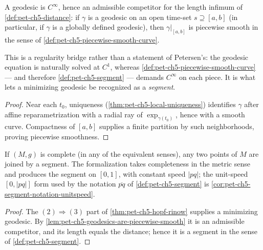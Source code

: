 \begin{lemma}
  \label{lem:pet-ch5-geodesics-are-piecewise-smooth}


  A geodesic is $C^\infty$, hence an admissible competitor for the length
  infimum of \cref{def:pet-ch5-distance}: if $\gamma$ is a geodesic on an open
  time-set $s\supseteq[a,b]$ (in particular, if $\gamma$ is a globally defined
  geodesic), then $\gamma|_{[a,b]}$ is piecewise smooth in the sense of
  \cref{def:pet-ch5-piecewise-smooth-curve}.

  This is a regularity bridge rather than a statement of Petersen's: the geodesic
  equation is naturally solved at $C^1$, whereas
  \cref{def:pet-ch5-piecewise-smooth-curve} — and therefore
  \cref{def:pet-ch5-segment} — demands $C^\infty$ on each piece. It is what lets
  a minimizing geodesic be recognized as a \emph{segment}.
\end{lemma}
\begin{proof}

  \sketch
  Near each $t_0$, uniqueness
  (\cref{thm:pet-ch5-local-uniqueness}) identifies $\gamma$ after affine
  reparametrization with a radial ray of $\exp_{\gamma(t_0)}$, hence with a smooth
  curve.  Compactness of $[a,b]$ supplies a finite partition by such neighborhoods,
  proving piecewise smoothness.
\end{proof}

\begin{corollary}
  \label{cor:pet-ch5-complete-segment-exists}


  If $(M,g)$ is complete (in any of the equivalent senses), any two points of $M$
  are joined by a segment.  The formalization takes completeness in the metric
  sense and produces the segment on $[0,1]$, with constant speed $|pq|$; the
  unit-speed $[0,|pq|]$ form used by the notation $\overline{pq}$ of
  \cref{def:pet-ch5-segment} is \cref{cor:pet-ch5-segment-notation-unitspeed}.
\end{corollary}
\begin{proof}

  \sketch
  The $(2)\Rightarrow(3)$ part of \cref{thm:pet-ch5-hopf-rinow} supplies a
  minimizing geodesic.  By \cref{lem:pet-ch5-geodesics-are-piecewise-smooth} it is
  an admissible competitor, and its length equals the distance; hence it is a
  segment in the sense of \cref{def:pet-ch5-segment}.
\end{proof}

